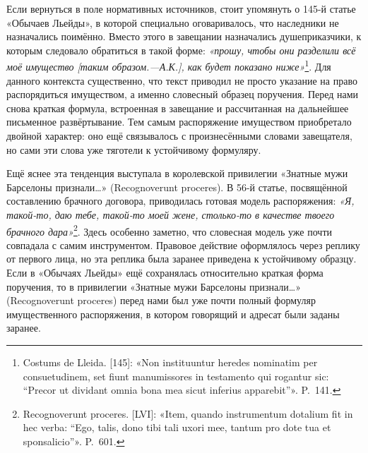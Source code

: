 Если вернуться в поле нормативных источников, стоит упомянуть о 145-й статье «Обычаев Льейды», в которой специально оговаривалось, что наследники не назначались поимённо. Вместо этого в завещании назначались душеприказчики, к которым следовало обратиться в такой форме: \emph{«прошу, чтобы они разделили всё моё имущество [таким образом.---А.К.], как будет показано ниже»}\footnote{Costums de Lleida. [145]: «Non instituuntur heredes nominatim per consuetudinem, set fiunt manumissores in testamento qui rogantur sic: “Precor ut dividant omnia bona mea sicut inferius apparebit”». P.~141.}. Для данного контекста существенно, что текст приводил не просто указание на право распорядиться имуществом, а именно словесный образец поручения. Перед нами снова краткая формула, встроенная в завещание и рассчитанная на дальнейшее письменное развёртывание. Тем самым распоряжение имуществом приобретало двойной характер: оно ещё связывалось с произнесёнными словами завещателя, но сами эти слова уже тяготели к устойчивому формуляру.

Ещё яснее эта тенденция выступала в королевской привилегии «Знатные мужи Барселоны признали…» (Recognoverunt proceres). В 56-й статье, посвящённой составлению брачного договора, приводилась готовая модель распоряжения: \emph{«Я, такой-то, даю тебе, такой-то моей жене, столько-то в качестве твоего брачного дара»}\footnote{Recognoverunt proceres. [LVI]: «Item, quando instrumentum dotalium fit in hec verba: “Ego, talis, dono tibi tali uxori mee, tantum pro dote tua et sponsalicio”». P.~601.}. Здесь особенно заметно, что словесная модель уже почти совпадала с самим инструментом. Правовое действие оформлялось через реплику от первого лица, но эта реплика была заранее приведена к устойчивому образцу. Если в «Обычаях Льейды» ещё сохранялась относительно краткая форма поручения, то в привилегии «Знатные мужи Барселоны признали…» (Recognoverunt proceres) перед нами был уже почти полный формуляр имущественного распоряжения, в котором говорящий и адресат были заданы заранее.


